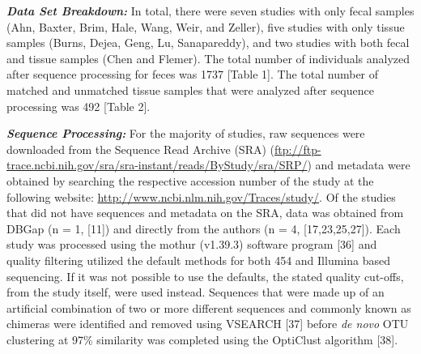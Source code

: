 \documentclass[12pt,]{article}
\begin{document}
\textbf{\emph{Data Set Breakdown:}} In total, there were seven studies
with only fecal samples (Ahn, Baxter, Brim, Hale, Wang, Weir, and
Zeller), five studies with only tissue samples (Burns, Dejea, Geng, Lu,
Sanapareddy), and two studies with both fecal and tissue samples (Chen
and Flemer). The total number of individuals analyzed after sequence
processing for feces was 1737 {[}Table 1{]}. The total number of matched
and unmatched tissue samples that were analyzed after sequence
processing was 492 {[}Table 2{]}.

\textbf{\emph{Sequence Processing:}} For the majority of studies, raw
sequences were downloaded from the Sequence Read Archive (SRA)
(\url{ftp://ftp-trace.ncbi.nih.gov/sra/sra-instant/reads/ByStudy/sra/SRP/})
and metadata were obtained by searching the respective accession number
of the study at the following website:
\url{http://www.ncbi.nlm.nih.gov/Traces/study/}. Of the studies that did
not have sequences and metadata on the SRA, data was obtained from DBGap
(n = 1, {[}11{]}) and directly from the authors (n = 4,
{[}17,23,25,27{]}). Each study was processed using the mothur (v1.39.3)
software program {[}36{]} and quality filtering utilized the default
methods for both 454 and Illumina based sequencing. If it was not
possible to use the defaults, the stated quality cut-offs, from the
study itself, were used instead. Sequences that were made up of an
artificial combination of two or more different sequences and commonly
known as chimeras were identified and removed using VSEARCH {[}37{]}
before \emph{de novo} OTU clustering at 97\% similarity was completed
using the OptiClust algorithm {[}38{]}.
\end{document}
